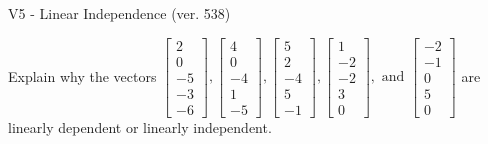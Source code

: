 \begin{exercise}
  \begin{exerciseTitle}V5 - Linear Independence (ver. 538)\end{exerciseTitle}
  \begin{exerciseStatement}
    Explain why the vectors \(\left[\begin{array}{r}
2 \\
0 \\
-5 \\
-3 \\
-6
\end{array}\right] , \left[\begin{array}{r}
4 \\
0 \\
-4 \\
1 \\
-5
\end{array}\right] , \left[\begin{array}{r}
5 \\
2 \\
-4 \\
5 \\
-1
\end{array}\right] , \left[\begin{array}{r}
1 \\
-2 \\
-2 \\
3 \\
0
\end{array}\right] , \text{ and } \left[\begin{array}{r}
-2 \\
-1 \\
0 \\
5 \\
0
\end{array}\right]\) are linearly dependent or linearly independent.	



\end{exerciseStatement}
\end{exercise}
